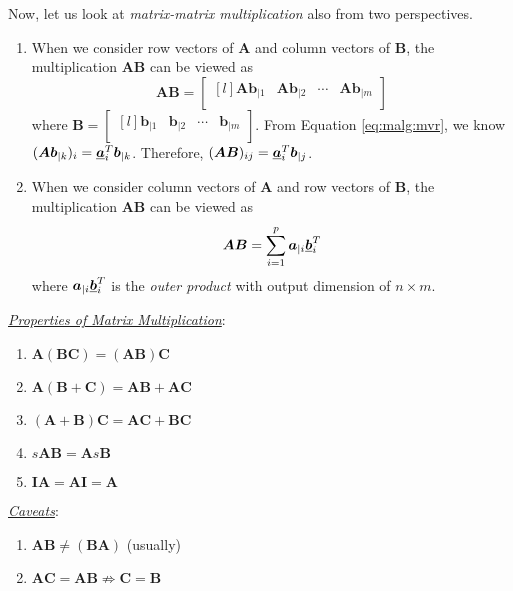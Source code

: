 Now, let us look at \emph{matrix-matrix multiplication} also from two perspectives.

\begin{enumerate}[label=\theenumi)]
    \item When we consider row vectors of $\bm{A}$ and column vectors of $\bm{B}$, the multiplication $\bm{AB}$ can be viewed as
        \begin{equation}
            \bm{A}\bm{B} =  \begin{bmatrix*}[l]
            \bm{Ab}_{|1} & \bm{Ab}_{|2} & \cdots & \bm{Ab}_{|m}\\
            \end{bmatrix*}
        \end{equation}
    where $\bm{B}=\begin{bmatrix*}[l]
        \bm{b}_{|1} & \bm{b}_{|2} & \cdots & \bm{b}_{|m}\\
        \end{bmatrix*}$. From Equation \ref{eq:malg:mvr}, we know $(\bm{Ab}_{|k})_i=\bm{\underline{a}}_i^T\bm{b}_{|k}$. Therefore, $(\bm{AB})_{ij}=\bm{\underline{a}}_i^T\bm{b}_{|j}$.
        
    \item When we consider column vectors of $\bm{A}$ and row vectors of $\bm{B}$, the multiplication $\bm{AB}$ can be viewed as 
    \begin{equation}\label{eq:mmult_2}
        \bm{AB}=\sum_{i=1}^{p}\bm{a}_{|i}\bm{\underline{b}}_i^T
    \end{equation}
    where $\bm{a}_{|i}\bm{\underline{b}}_i^T$ is the \emph{outer product} with output dimension of $n\times m$.
\end{enumerate} 


\noindent\underline{\textit{Properties of Matrix Multiplication}}:
\begin{enumerate}[label=\theenumi)]
    \item $\bm{A}(\bm{BC})=(\bm{AB})\bm{C}$
    \item $\bm{A}(\bm{B}+\bm{C})=\bm{AB} + \bm{AC}$
    \item $(\bm{A+B})\bm{C}=\bm{AC} + \bm{BC}$
    \item $s\bm{AB}=\bm{A}s\bm{B}$
    \item $\bm{IA}=\bm{AI}=\bm{A}$
\end{enumerate}

\noindent\underline{\textit{Caveats}}:
\begin{enumerate}[label=\theenumi)]
    \item $\bm{AB}\neq(\bm{BA})$ (usually)
    \item $\bm{AC}=\bm{AB} \not\Rightarrow \bm{C} = \bm{B}$
\end{enumerate}

